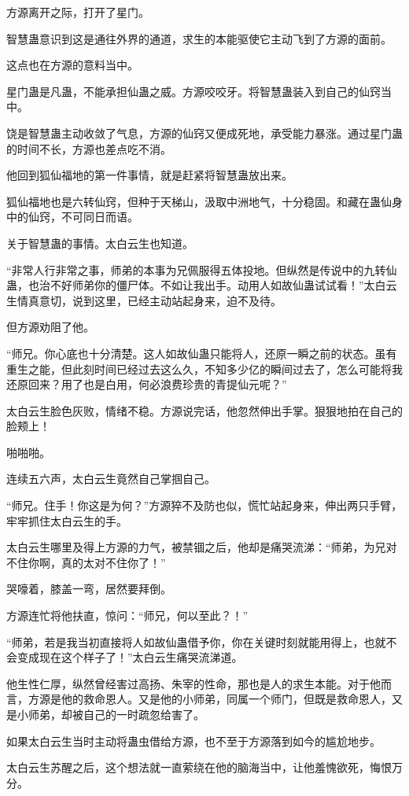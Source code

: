 \begin{this_body}
方源离开之际，打开了星门。

智慧蛊意识到这是通往外界的通道，求生的本能驱使它主动飞到了方源的面前。

这点也在方源的意料当中。

星门蛊是凡蛊，不能承担仙蛊之威。方源咬咬牙。将智慧蛊装入到自己的仙窍当中。

饶是智慧蛊主动收敛了气息，方源的仙窍又便成死地，承受能力暴涨。通过星门蛊的时间不长，方源也差点吃不消。

他回到狐仙福地的第一件事情，就是赶紧将智慧蛊放出来。

狐仙福地也是六转仙窍，但种于天梯山，汲取中洲地气，十分稳固。和藏在蛊仙身中的仙窍，不可同日而语。

关于智慧蛊的事情。太白云生也知道。

“非常人行非常之事，师弟的本事为兄佩服得五体投地。但纵然是传说中的九转仙蛊，也治不好师弟你的僵尸体。不如让我出手。动用人如故仙蛊试试看！”太白云生情真意切，说到这里，已经主动站起身来，迫不及待。

但方源劝阻了他。

“师兄。你心底也十分清楚。这人如故仙蛊只能将人，还原一瞬之前的状态。虽有重生之能，但此刻时间已经过去这么久，不知多少亿的瞬间过去了，怎么可能将我还原回来？用了也是白用，何必浪费珍贵的青提仙元呢？”

太白云生脸色灰败，情绪不稳。方源说完话，他忽然伸出手掌。狠狠地拍在自己的脸颊上！

啪啪啪。

连续五六声，太白云生竟然自己掌掴自己。

“师兄。住手！你这是为何？”方源猝不及防也似，慌忙站起身来，伸出两只手臂，牢牢抓住太白云生的手。

太白云生哪里及得上方源的力气，被禁锢之后，他却是痛哭流涕：“师弟，为兄对不住你啊，真的太对不住你了！”

哭嚎着，膝盖一弯，居然要拜倒。

方源连忙将他扶直，惊问：“师兄，何以至此？！”

“师弟，若是我当初直接将人如故仙蛊借予你，你在关键时刻就能用得上，也就不会变成现在这个样子了！”太白云生痛哭流涕道。

他生性仁厚，纵然曾经害过高扬、朱宰的性命，那也是人的求生本能。对于他而言，方源是他的救命恩人。又是他的小师弟，同属一个师门，但既是救命恩人，又是小师弟，却被自己的一时疏忽给害了。

如果太白云生当时主动将蛊虫借给方源，也不至于方源落到如今的尴尬地步。

太白云生苏醒之后，这个想法就一直萦绕在他的脑海当中，让他羞愧欲死，悔恨万分。


\end{this_body}
